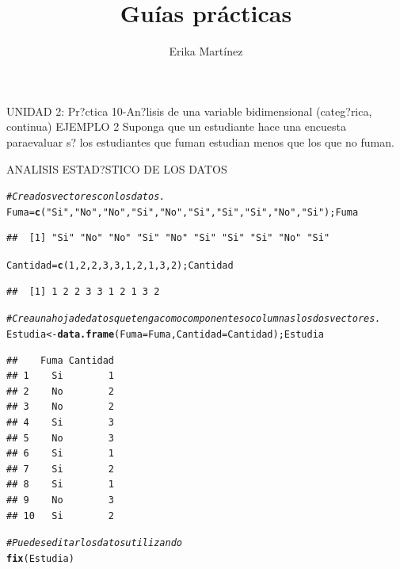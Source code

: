 \documentclass[10pt,a4paper]{article}\usepackage[]{graphicx}\usepackage[]{color}
\author{Erika Martínez}
\title{Guías prácticas}
\makeatletter
\newcommand{\hlnum}[1]{\textcolor[rgb]{0.686,0.059,0.569}{#1}}%
\newcommand{\hlstr}[1]{\textcolor[rgb]{0.192,0.494,0.8}{#1}}%
\newcommand{\hlcom}[1]{\textcolor[rgb]{0.678,0.584,0.686}{\textit{#1}}}%
\newcommand{\hlstd}[1]{\textcolor[rgb]{0.345,0.345,0.345}{#1}}%
\newcommand{\hlkwb}[1]{\textcolor[rgb]{0.69,0.353,0.396}{#1}}%
\newcommand{\hlkwc}[1]{\textcolor[rgb]{0.333,0.667,0.333}{#1}}%
\newcommand{\hlkwd}[1]{\textcolor[rgb]{0.737,0.353,0.396}{\textbf{#1}}}%
\newenvironment{kframe}{%
 \def\at@end@of@kframe{}%
 \ifinner\ifhmode%
  \def\at@end@of@kframe{\end{minipage}}%
  \begin{minipage}{\columnwidth}%
 \fi\fi%
 \def\FrameCommand##1{\hskip\@totalleftmargin \hskip-\fboxsep
 \colorbox{shadecolor}{##1}\hskip-\fboxsep
     \hskip-\linewidth \hskip-\@totalleftmargin \hskip\columnwidth}%
 \MakeFramed {\advance\hsize-\width
   \@totalleftmargin\z@ \linewidth\hsize
   \@setminipage}}%
 {\par\unskip\endMakeFramed%
 \at@end@of@kframe}
\newenvironment{knitrout}{}{} %
\makeatother
\begin{document}
\maketitle
\newpage

UNIDAD 2: Pr?ctica 10-An?lisis de una variable bidimensional (categ?rica, continua)
EJEMPLO 2 Suponga que un estudiante hace una encuesta paraevaluar s? los 
estudiantes que fuman estudian menos que los que no fuman.

ANALISIS ESTAD?STICO DE LOS DATOS

\begin{knitrout}
\color{fgcolor}\begin{kframe}
\begin{alltt}
\hlcom{#Crea dos vectores con los datos.}
\hlstd{Fuma} \hlkwb{=} \hlkwd{c}\hlstd{(}\hlstr{"Si"}\hlstd{,}\hlstr{"No"}\hlstd{,}\hlstr{"No"}\hlstd{,}\hlstr{"Si"}\hlstd{,}\hlstr{"No"}\hlstd{,}\hlstr{"Si"}\hlstd{,}\hlstr{"Si"}\hlstd{,}\hlstr{"Si"}\hlstd{,}\hlstr{"No"}\hlstd{,}\hlstr{"Si"}\hlstd{); Fuma}
\end{alltt}
\begin{verbatim}
##  [1] "Si" "No" "No" "Si" "No" "Si" "Si" "Si" "No" "Si"
\end{verbatim}
\begin{alltt}
\hlstd{Cantidad} \hlkwb{=} \hlkwd{c}\hlstd{(}\hlnum{1}\hlstd{,}\hlnum{2}\hlstd{,}\hlnum{2}\hlstd{,}\hlnum{3}\hlstd{,}\hlnum{3}\hlstd{,}\hlnum{1}\hlstd{,}\hlnum{2}\hlstd{,}\hlnum{1}\hlstd{,}\hlnum{3}\hlstd{,}\hlnum{2}\hlstd{); Cantidad}
\end{alltt}
\begin{verbatim}
##  [1] 1 2 2 3 3 1 2 1 3 2
\end{verbatim}
\begin{alltt}
\hlcom{#Crea una hoja de datos que tenga comocomponentes o columnas los dos vectores. }
\hlstd{Estudia} \hlkwb{<-} \hlkwd{data.frame}\hlstd{(}\hlkwc{Fuma}\hlstd{=Fuma,} \hlkwc{Cantidad}\hlstd{=Cantidad); Estudia}
\end{alltt}
\begin{verbatim}
##    Fuma Cantidad
## 1    Si        1
## 2    No        2
## 3    No        2
## 4    Si        3
## 5    No        3
## 6    Si        1
## 7    Si        2
## 8    Si        1
## 9    No        3
## 10   Si        2
\end{verbatim}
\begin{alltt}
\hlcom{# Puedes editar los datos utilizando }
\hlkwd{fix}\hlstd{(Estudia)}


\end{alltt}
\end{kframe}
\end{knitrout}
\end{document}
